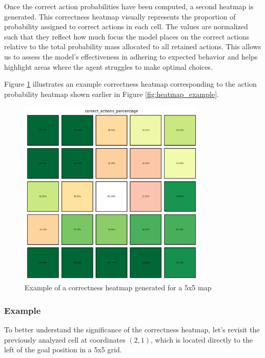 Once the correct action probabilities have been computed, a second heatmap is
generated. This correctness heatmap visually represents the proportion of probability
assigned to correct actions in each cell. The values are normalized such that
they reflect how much focus the model places on the correct actions relative to
the total probability mass allocated to all retained actions. This allows us to assess
the model's effectiveness in adhering to expected behavior and helps highlight areas
where the agent struggles to make optimal choices.

Figure \ref{fig:correctness_example} illustrates an example correctness heatmap corresponding
to the action probability heatmap shown earlier in Figure \ref{fig:heatmap_example}.

\begin{figure}[ht!]
  \centering
  \includegraphics[width=0.8\textwidth]{
    images/data_collection/correctness_example.png
  }
  \caption{Example of a correctness heatmap generated for a 5x5 map}
  \label{fig:correctness_example}
\end{figure}

\subsubsection{Example}

To better understand the significance of the correctness heatmap, let's revisit
the previously analyzed cell at coordinates $(2,1)$, which is located directly to
the left of the goal position in a 5x5 grid.

